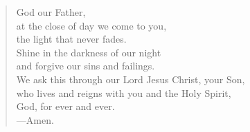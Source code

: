 \prayer

\setlength{\vleftmargin}{\prayerleftmargini}

\begin{verse}
God our Father,\\
at the close of day we come to you,\\
the light that never fades.\\
Shine in the darkness of our night\\
and forgive our sins and failings.\\
We ask this through our Lord Jesus Christ, your Son,\\
who lives and reigns with you and the Holy Spirit,\\
God, for ever and ever.\\
{\color{red}---\thinspace}Amen.
\end{verse}

\setlength{\vleftmargin}{\defleftmargini}